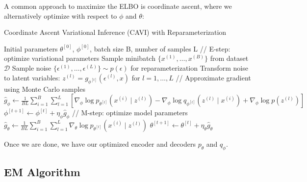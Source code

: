 \documentclass{article}
\begin{document}
  \begin{algo}
    A common approach to maximize the ELBO is coordinate ascent, where we alternatively optimize with respect to $\phi$ and $\theta$:

    \begin{algorithm}[H]
      \caption{Coordinate Ascent Variational Inference (CAVI) with Reparameterization}
      \begin{algorithmic}[1]
        \Require Initial parameters $\theta^{[0]}$, $\phi^{[0]}$, batch size B, number of samples L
          \State // E-step: optimize variational parameters
          \State Sample minibatch $\{x^{(1)}, \ldots, x^{(B)}\}$ from dataset $\mathcal{D}$
          \State Sample noise $\{\epsilon^{(1)}, \ldots, \epsilon^{(L)}\} \sim p(\epsilon)$ for reparameterization
          \State Transform noise to latent variables: $z^{(l)} = g_{\phi^{[t]}}(\epsilon^{(l)}, x)$ for $l=1,\ldots,L$
          \State // Approximate gradient using Monte Carlo samples
          \State $\hat{g}_\phi \gets \frac{1}{BL} \sum_{i=1}^B \sum_{l=1}^L [\nabla_\phi \log p_{\theta^{[t]}}(x^{(i)} \mid z^{(l)}) - \nabla_\phi \log q_{\phi^{[t]}}(z^{(l)} \mid x^{(i)}) + \nabla_\phi \log p(z^{(l)})]$
          \State $\phi^{[t+1]} \gets \phi^{[t]} + \eta_\phi \hat{g}_\phi$ 
          \State // M-step: optimize model parameters
          \State $\hat{g}_\theta \gets \frac{1}{BL} \sum_{i=1}^B \sum_{l=1}^L \nabla_\theta \log p_{\theta^{[t]}}(x^{(i)} \mid z^{(l)})$
          \State $\theta^{[t+1]} \gets \theta^{[t]} + \eta_\theta \hat{g}_\theta$ 
        \EndWhile
      \end{algorithmic}
    \end{algorithm}
  \end{algo} 

  Once we are done, we have our optimized encoder and decoders $p_\theta$ and $q_\phi$. 

\subsection{EM Algorithm} 
\end{document}
